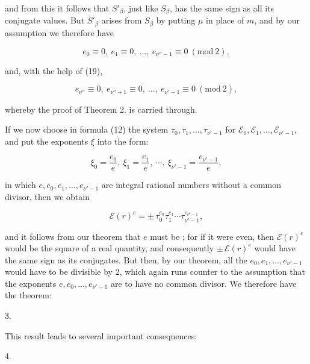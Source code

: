 
and from this it follows that $S'_\beta$, just like $S_\beta$, has the same sign as all its conjugate values. But $S'_\beta$ arises from $S_\beta$ by putting $\mu$ in place of $m$, and by our assumption we therefore have

\[
e_0 \equiv 0,\ e_1 \equiv 0,\ \ldots,\ e_{\nu''-1} \equiv 0 \ (\mathrm{mod}\ 2),
\]

and, with the help of (19),

\[
e_{\nu''} \equiv 0,\ e_{\nu''+1} \equiv 0,\ \ldots,\ e_{\nu'-1} \equiv 0 \ (\mathrm{mod}\ 2),
\]

whereby the proof of Theorem 2. is carried through.

If we now choose in formula (12) the system $\tau_0, \tau_1, \ldots, \tau_{\nu'-1}$ for $\mathcal{E}_0, \mathcal{E}_1, \ldots, \mathcal{E}_{\nu'-1}$, and put the exponents $\xi$ into the form:

\[
\xi_0 = \frac{e_0}{e},\ \xi_1 = \frac{e_1}{e},\ \cdots,\ \xi_{\nu'-1} = \frac{e_{\nu'-1}}{e},
\]

in which $e, e_0, e_1, \ldots, e_{\nu'-1}$ are integral rational numbers without a common divisor, then we obtain

\[
\mathcal{E}(r)^e = \pm\, \tau_0^{e_0}\tau_1^{e_1} \cdots \tau_{\nu'-1}^{e_{\nu'-1}},
\]

and it follows from our theorem that $e$ must be ; for if it were even, then $\mathcal{E}(r)^e$ would be the square of a real quantity, and consequently $\pm\, \mathcal{E}(r)^e$ would have the same sign as its conjugates. But then, by our theorem, all the $e_0, e_1, \ldots, e_{\nu'-1}$ would have to be divisible by 2, which again runs counter to the assumption that the exponents $e, e_0, \ldots, e_{\nu'-1}$ are to have no common divisor. We therefore have the theorem:

3. 



This result leads to several important consequences:

4. 


